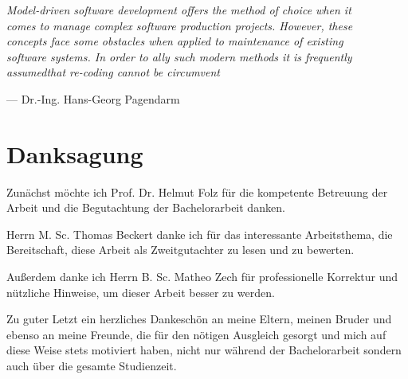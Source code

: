 
\begin{flushright}{\slshape    
    Model-driven software development offers the method of choice when it \\ 
    comes to manage complex software production projects. However, these\\ 
    concepts face some obstacles when applied to maintenance of existing\\
    software systems. In order to ally such modern methods it is frequently\\
    assumedthat re-coding cannot be circumvent} \\ \medskip
     
    --- Dr.-Ing. Hans-Georg Pagendarm \cite{Wagner2014}
\end{flushright}

\bigskip

\begingroup
	\let\clearpage\relax
	\let\cleardoublepage\relax
	\let\cleardoublepage\relax
	\chapter*{Danksagung}
	
	Zunächst möchte ich Prof. Dr. Helmut Folz für die kompetente Betreuung der Arbeit und die Begutachtung der Bachelorarbeit danken.
	
	Herrn M. Sc. Thomas Beckert danke ich für das interessante Arbeitsthema, die Bereitschaft, diese Arbeit als Zweitgutachter zu lesen und zu bewerten.
	
	Außerdem danke ich Herrn B. Sc. Matheo Zech für professionelle Korrektur und nützliche Hinweise, um dieser Arbeit besser zu werden.
	
	Zu guter Letzt ein herzliches Dankeschön an meine Eltern, meinen Bruder und ebenso
	an meine Freunde, die für den nötigen Ausgleich gesorgt und mich auf diese Weise stets
	motiviert haben, nicht nur während der Bachelorarbeit sondern auch über die gesamte
	Studienzeit.
\endgroup

